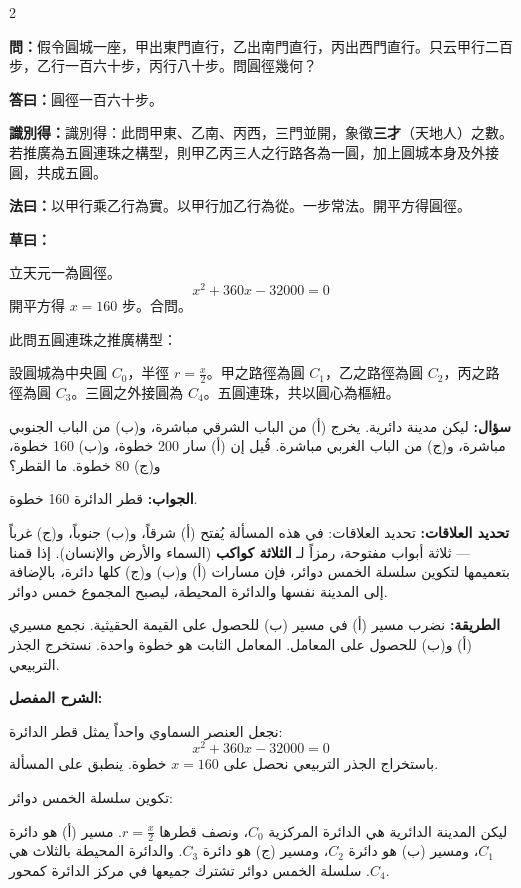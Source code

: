 \documentclass[11pt,a4paper]{article}
\newcommand{\ar}[1]{\arabicfont\beginR #1\endR}
\newcommand{\arb}[1]{\textbf{\arabicfont\beginR #1\endR}}
\newcommand{\arnote}[1]{\textcolor{arabicblue}{\ar{#1}}}
\newcommand{\wen}[1]{\par\noindent\textbf{\textcolor{probcolor}{問：}}{#1}\par}
\newcommand{\da}[1]{\par\noindent\textbf{\textcolor{anscolor}{答曰：}}{#1}\par}
\newcommand{\fayue}[1]{\par\noindent\textbf{\textcolor{methodcolor}{法曰：}}{#1}\par}
\newcommand{\caoyue}[1]{\par\noindent\textbf{草曰：}{#1}\par}
\newcommand{\zhi}[1]{\par\noindent\textbf{識別得：}{#1}\par}
\newcommand{\arwen}[1]{\par\noindent\arb{سؤال: }\arnote{#1}\par}
\newcommand{\arjwb}[1]{\par\noindent\arb{الجواب: }\arnote{#1}\par}
\newcommand{\arqwd}[1]{\par\noindent\arb{الطريقة: }\arnote{#1}\par}
\newcommand{\arshr}[1]{\par\noindent\arb{الشرح المفصل: }\arnote{#1}\par}
\newcommand{\arfl}[1]{\par\noindent\arb{تحديد العلاقات: }\arnote{#1}\par}
\begin{document}
\begin{paracol}{2}

\begin{leftcolumn}
\wen{假令圓城一座，甲出東門直行，乙出南門直行，丙出西門直行。只云甲行二百步，乙行一百六十步，丙行八十步。問圓徑幾何？}

\da{圓徑一百六十步。}

\zhi{識別得：此問甲東、乙南、丙西，三門並開，象徵\textbf{三才}（天地人）之數。若推廣為五圓連珠之構型，則甲乙丙三人之行路各為一圓，加上圓城本身及外接圓，共成五圓。}

\fayue{以甲行乘乙行為實。以甲行加乙行為從。一步常法。開平方得圓徑。}

\caoyue{
立天元一為圓徑。
$$x^2 + 360x - 32000 = 0$$
開平方得 $x = 160$ 步。合問。

此問五圓連珠之推廣構型：

設圓城為中央圓 $C_0$，半徑 $r = \frac{x}{2}$。甲之路徑為圓 $C_1$，乙之路徑為圓 $C_2$，丙之路徑為圓 $C_3$。三圓之外接圓為 $C_4$。五圓連珠，共以圓心為樞紐。}
\end{leftcolumn}

\begin{rightcolumn}
\arwen{ليكن مدينة دائرية. يخرج (أ) من الباب الشرقي مباشرة، و(ب) من الباب الجنوبي مباشرة، و(ج) من الباب الغربي مباشرة. قُيل إن (أ) سار 200 خطوة، و(ب) 160 خطوة، و(ج) 80 خطوة. ما القطر؟}

\arjwb{قطر الدائرة 160 خطوة.}

\arfl{تحديد العلاقات: في هذه المسألة يُفتح (أ) شرقاً، و(ب) جنوباً، و(ج) غرباً — ثلاثة أبواب مفتوحة، رمزاً لـ \textbf{الثلاثة كواكب} (السماء والأرض والإنسان). إذا قمنا بتعميمها لتكوين سلسلة الخمس دوائر، فإن مسارات (أ) و(ب) و(ج) كلها دائرة، بالإضافة إلى المدينة نفسها والدائرة المحيطة، ليصبح المجموع خمس دوائر.}

\arqwd{نضرب مسير (أ) في مسير (ب) للحصول على القيمة الحقيثية. نجمع مسيري (أ) و(ب) للحصول على المعامل. المعامل الثابت هو خطوة واحدة. نستخرج الجذر التربيعي.}

\arshr{نجعل العنصر السماوي واحداً يمثل قطر الدائرة:
$$x^2 + 360x - 32000 = 0$$
باستخراج الجذر التربيعي نحصل على $x = 160$ خطوة. ينطبق على المسألة.

تكوين سلسلة الخمس دوائر:

ليكن المدينة الدائرية هي الدائرة المركزية $C_0$، ونصف قطرها $r = \frac{x}{2}$. مسير (أ) هو دائرة $C_1$، ومسير (ب) هو دائرة $C_2$، ومسير (ج) هو دائرة $C_3$. والدائرة المحيطة بالثلاث هي $C_4$. سلسلة الخمس دوائر تشترك جميعها في مركز الدائرة كمحور.}
\end{rightcolumn}

\end{paracol}
\end{document}
